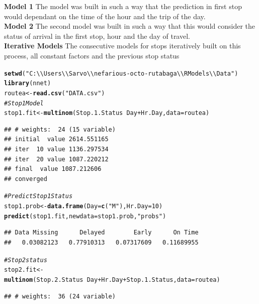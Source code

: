 \documentclass[12pt]{article}\usepackage[]{graphicx}\usepackage[]{color}
\makeatletter
\newcommand{\hlnum}[1]{\textcolor[rgb]{0.686,0.059,0.569}{#1}}%
\newcommand{\hlstr}[1]{\textcolor[rgb]{0.192,0.494,0.8}{#1}}%
\newcommand{\hlcom}[1]{\textcolor[rgb]{0.678,0.584,0.686}{\textit{#1}}}%
\newcommand{\hlopt}[1]{\textcolor[rgb]{0,0,0}{#1}}%
\newcommand{\hlstd}[1]{\textcolor[rgb]{0.345,0.345,0.345}{#1}}%
\newcommand{\hlkwb}[1]{\textcolor[rgb]{0.69,0.353,0.396}{#1}}%
\newcommand{\hlkwc}[1]{\textcolor[rgb]{0.333,0.667,0.333}{#1}}%
\newcommand{\hlkwd}[1]{\textcolor[rgb]{0.737,0.353,0.396}{\textbf{#1}}}%
\newenvironment{kframe}{%
 \def\at@end@of@kframe{}%
 \ifinner\ifhmode%
  \def\at@end@of@kframe{\end{minipage}}%
  \begin{minipage}{\columnwidth}%
 \fi\fi%
 \def\FrameCommand##1{\hskip\@totalleftmargin \hskip-\fboxsep
 \colorbox{shadecolor}{##1}\hskip-\fboxsep
     \hskip-\linewidth \hskip-\@totalleftmargin \hskip\columnwidth}%
 \MakeFramed {\advance\hsize-\width
   \@totalleftmargin\z@ \linewidth\hsize
   \@setminipage}}%
 {\par\unskip\endMakeFramed%
 \at@end@of@kframe}
\newenvironment{knitrout}{}{} %
\makeatother
\begin{document}
\textbf{Model 1} The model was built in such a way that the prediction in first stop would dependant on the time of the hour and the trip of the day.\\
\textbf{Model 2} The second model was built in such a way that this would consider the status of arrival in the first stop, hour and the day of travel.\\
\textbf{Iterative Models} The consecutive models for stops iteratively built on this process, all constant factors and the previous stop status
\begin{knitrout}
\color{fgcolor}\begin{kframe}
\begin{alltt}
\hlkwd{setwd}\hlstd{(}\hlstr{"C:\textbackslash{}\textbackslash{}Users\textbackslash{}\textbackslash{}Sarvo\textbackslash{}\textbackslash{}nefarious-octo-rutabaga\textbackslash{}\textbackslash{}R Models\textbackslash{}\textbackslash{}Data"}\hlstd{)}
\hlkwd{library}\hlstd{(nnet)}
\hlstd{routea}\hlkwb{<-}\hlkwd{read.csv}\hlstd{(}\hlstr{"DATA.csv"}\hlstd{)}
\hlcom{# Stop 1 Model}
\hlstd{stop1.fit}\hlkwb{<-}\hlkwd{multinom}\hlstd{(Stop.1.Status}\hlopt{~}\hlstd{Day}\hlopt{+}\hlstd{Hr.Day,}\hlkwc{data}\hlstd{=routea)}
\end{alltt}
\begin{verbatim}
## # weights:  24 (15 variable)
## initial  value 2614.551165 
## iter  10 value 1136.297534
## iter  20 value 1087.220212
## final  value 1087.212606 
## converged
\end{verbatim}
\begin{alltt}
\hlcom{# Predict Stop 1 Status}
\hlstd{stop1.prob}\hlkwb{<-}\hlkwd{data.frame}\hlstd{(}\hlkwc{Day}\hlstd{=}\hlkwd{c}\hlstd{(}\hlstr{"M"}\hlstd{),}\hlkwc{Hr.Day}\hlstd{=}\hlnum{10}\hlstd{)}
\hlkwd{predict}\hlstd{(stop1.fit,}\hlkwc{newdata} \hlstd{= stop1.prob,}\hlstr{"probs"}\hlstd{)}
\end{alltt}
\begin{verbatim}
## Data Missing      Delayed        Early      On Time 
##   0.03082123   0.77910313   0.07317609   0.11689955
\end{verbatim}
\begin{alltt}
\hlcom{#Stop 2 status}
\hlstd{stop2.fit}\hlkwb{<-}\hlkwd{multinom}\hlstd{(Stop.2.Status}\hlopt{~}\hlstd{Day}\hlopt{+}\hlstd{Hr.Day}\hlopt{+}\hlstd{Stop.1.Status,}\hlkwc{data}\hlstd{=routea)}
\end{alltt}
\begin{verbatim}
## # weights:  36 (24 variable)

\end{verbatim}
\end{kframe}
\end{knitrout}
\end{document}
